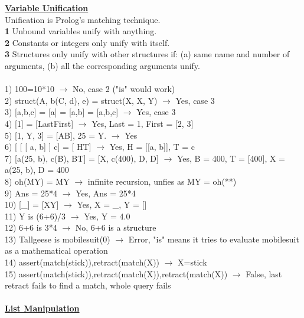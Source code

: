 \documentclass[8pt,letterpaper,twocolumn]{article}
\begin{document}
\underline{\textbf{Variable Unification}}\\
Unification is Prolog's matching technique.\\
\textbf{1} Unbound variables unify with anything.\\
\textbf{2} Constants or integers only unify with itself.\\
\textbf{3} Structures only unify with other structures if:
(a) same name and number of arguments, (b) all the corresponding arguments unify.\\
\\
1) 100=10*10 $\rightarrow$ No, case 2 ("is" would work)\\
2) struct(A, b(C, d), e) = struct(X, X, Y) $\rightarrow$ Yes, case 3\\
3) [a,b,c] = [a\textbar[b,c]] = [a,b\textbar[c]] = [a,b,c\textbar[]] $\rightarrow$ Yes, case 3\\
4) [1\textbar [2, 3]] = [Last\textbar First] $\rightarrow$ Yes, Last = 1, First = [2, 3]\\
5) [1, Y, 3] = [A\textbar B],  25 = Y. $\rightarrow$ Yes\\
6) [ [ [ a, b] ] \textbar c] = [ H\textbar T] $\rightarrow$ Yes, H = [[a, b]], T = c\\
7) [a(25, b), c(B), B\textbar T] = [X, c(400), D, D] $\rightarrow$ Yes, B = 400, T = [400], X = a(25, b), D = 400\\
8) oh(MY) = MY $\rightarrow$ infinite recursion, unfies as MY = oh(**)\\
9) Ans = 25*4 $\rightarrow$ Yes, Ans = 25*4\\
10) [\_] = [X\textbar Y] $\rightarrow$ Yes, X = \_, Y = []\\
11) Y is (6+6)/3 $\rightarrow$ Yes, Y = 4.0\\
12) 6+6 is 3*4 $\rightarrow$ No, 6+6 is a structure\\
13) Tallgeese is mobilesuit(0) $\rightarrow$ Error, "is" means it tries to evaluate mobilesuit as a mathematical operation\\
14) assert(match(stick)),retract(match(X)) $\rightarrow$ X=stick\\
15) assert(match(stick)),retract(match(X)),retract(match(X)) $\rightarrow$ False, last retract fails to find a match, whole query fails\\
\\
\underline{\textbf{List Manipulation}}
\end{document}
